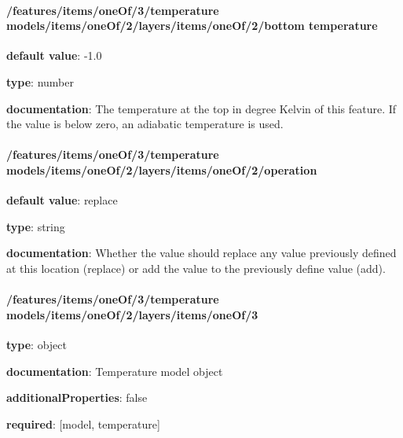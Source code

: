 \begin{itemized}
\end{itemized}\paragraph{/features/items/oneOf/3/temperature models/items/oneOf/2/layers/items/oneOf/2/bottom temperature} \begin{itemized}
\item {\bf default value}: -1.0
\item {\bf type}: number
\item {\bf documentation}: The temperature at the top in degree Kelvin of this feature. If the value is below zero, an adiabatic temperature is used.
\end{itemized}\paragraph{/features/items/oneOf/3/temperature models/items/oneOf/2/layers/items/oneOf/2/operation} \begin{itemized}
\item {\bf default value}: replace
\item {\bf type}: string
\item {\bf documentation}: Whether the value should replace any value previously defined at this location (replace) or add the value to the previously define value (add).
\end{itemized}\paragraph{/features/items/oneOf/3/temperature models/items/oneOf/2/layers/items/oneOf/3} \begin{itemized}
\item {\bf type}: object
\item {\bf documentation}: Temperature model object
\item {\bf additionalProperties}: false
\item {\bf required}: [model, temperature]\end{itemized}
